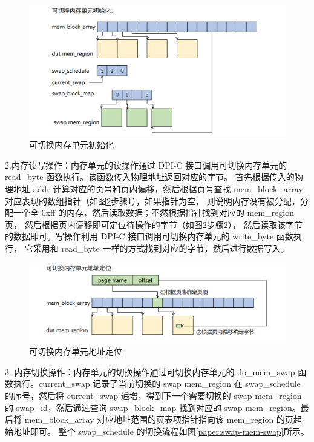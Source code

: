 \begin{figure}[!h]
    \centering
    \includegraphics[width=\linewidth]{figure/paper/swap-mem-init.png}
    \caption{可切换内存单元初始化}
    \label{paper:swap-mem-init}
\end{figure}

2.内存读写操作：内存单元的读操作通过 DPI-C 接口调用可切换内存单元的 read\_byte 函数执行。该函数传入物理地址返回对应的字节。
首先根据传入的物理地址 addr 计算对应的页号和页内偏移，然后根据页号查找 mem\_block\_array 对应表现的数组指针（如图\ref{paper:swap-mem-addr}步骤1），如果指针为空，
则说明内存没有被分配，分配一个全 0xff 的内存，然后读取数据；不然根据指针找到对应的 mem\_region 页，
然后根据页内偏移即可定位待操作的字节（如图\ref{paper:swap-mem-addr}步骤2），
然后读取该字节的数据即可。写操作利用 DPI-C 接口调用可切换内存单元的 write\_byte 函数执行，
它采用和 read\_byte 一样的方式找到对应的字节，然后进行数据写入。\par

\begin{figure}[!h]
    \centering
    \includegraphics[width=\linewidth]{figure/paper/swap-mem-addr.png}
    \caption{可切换内存单元地址定位}
    \label{paper:swap-mem-addr}
\end{figure}

3. 内存切换操作：内存单元的切换操作通过可切换内存单元的 do\_mem\_swap 函数执行。current\_swap 记录了当前切换的 swap mem\_region 在
swap\_schedule 的序号，然后将 current\_swap 递增，得到下一个需要切换的 swap mem\_region 的 swap\_id，然后通过查询 swap\_block\_map 
找到对应的 swap mem\_region。最后将 mem\_block\_array 对应地址范围的页表项指针指向该 mem\_region 的页起始地址即可。
整个 swap\_schedule 的切换流程如图\ref{paper:swap-mem-swap}所示。\par

